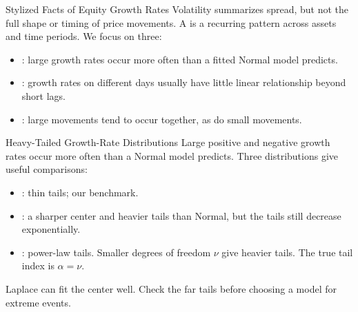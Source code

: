 \documentclass[aspectratio=169,11pt]{beamer}
\begin{document}
\begin{frame}{Stylized Facts of Equity Growth Rates}
  Volatility summarizes spread, but not the full shape or timing of price
  movements. A  is a recurring pattern across assets
  and time periods. We focus on three:

  \vspace{0.8em}
  \begin{itemize}\setlength{\itemsep}{0.8em}
    \item {}: large growth rates occur more often than a
      fitted Normal model predicts.
    \item {}: growth rates on different
      days usually have little linear relationship beyond short lags.
    \item {}: large movements tend to occur
      together, as do small movements.
  \end{itemize}

\end{frame}

\begin{frame}{\large Heavy-Tailed Growth-Rate Distributions}
  Large positive and negative growth rates occur more often than a Normal
  model predicts. Three distributions give useful comparisons:

  \vspace{0.7em}
  \begin{itemize}\setlength{\itemsep}{0.7em}
    \item {}: thin tails; our benchmark.
    \item {}: a sharper center and heavier tails than Normal,
      but the tails still decrease exponentially.
    \item {}: power-law tails. Smaller degrees of freedom
      $\nu$ give heavier tails. The true tail index is $\alpha=\nu$.
  \end{itemize}

  \vspace{0.5em}
  Laplace can fit the center well. Check the far tails before choosing a
  model for extreme events.
\end{frame}
\end{document}
